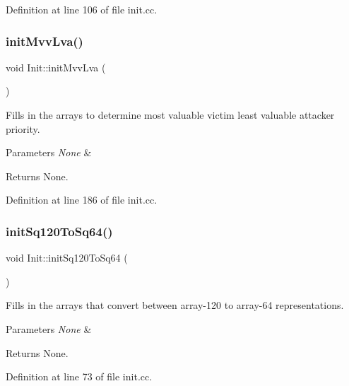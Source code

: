 Definition at line 106 of file init.\+cc.

\mbox{\label{namespaceInit_a87c48a69ce4bce6bd35619d9e9f8aee5}} 
\subsubsection{\texorpdfstring{init\+Mvv\+Lva()}{initMvvLva()}}
{\footnotesize\ttfamily void Init\+::init\+Mvv\+Lva (\begin{DoxyParamCaption}{ }\end{DoxyParamCaption})\hspace{0.3cm}{\ttfamily [noexcept]}}



Fills in the arrays to determine most valuable victim least valuable attacker priority. 


\begin{DoxyParams}{Parameters}
{\em None} & \\
\hline
\end{DoxyParams}
\begin{DoxyReturn}{Returns}
None. 
\end{DoxyReturn}


Definition at line 186 of file init.\+cc.

\mbox{\label{namespaceInit_a632a82ed6ce4587f5977a9089477d13a}} 
\subsubsection{\texorpdfstring{init\+Sq120\+To\+Sq64()}{initSq120ToSq64()}}
{\footnotesize\ttfamily void Init\+::init\+Sq120\+To\+Sq64 (\begin{DoxyParamCaption}{ }\end{DoxyParamCaption})\hspace{0.3cm}{\ttfamily [noexcept]}}



Fills in the arrays that convert between array-\/120 to array-\/64 representations. 


\begin{DoxyParams}{Parameters}
{\em None} & \\
\hline
\end{DoxyParams}
\begin{DoxyReturn}{Returns}
None. 
\end{DoxyReturn}


Definition at line 73 of file init.\+cc.

